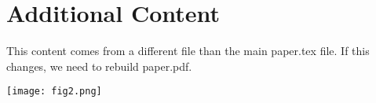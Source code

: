 
\section{Additional Content}

This content comes from a different file
than the main paper.tex file.
If this changes, we need to rebuild paper.pdf.

\texttt{[image: fig2.png]}

